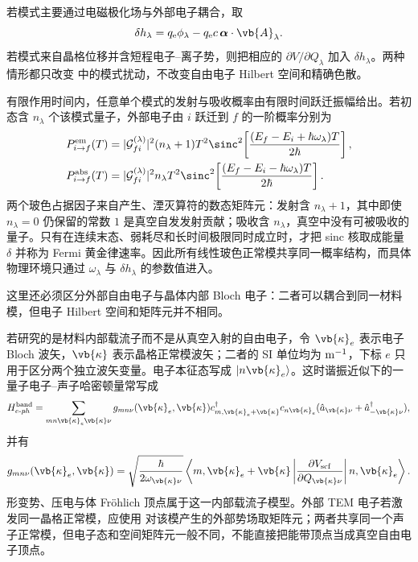 若模式主要通过电磁极化场与外部电子耦合，取
\begin{equation*}
\delta h_\lambda
=q_{\mathrm e}\phi_\lambda
-q_{\mathrm e} c\,\boldsymbol\alpha\cdot\vb{A}_\lambda.
\end{equation*}
若模式来自晶格位移并含短程电子--离子势，则把相应的 $\partial V/\partial Q_\lambda$ 加入 $\delta h_\lambda$。两种情形都只改变 中的模式扰动，不改变自由电子 Hilbert 空间和精确色散。

有限作用时间内，任意单个模式的发射与吸收概率由有限时间跃迁振幅给出。若初态含 $n_\lambda$ 个该模式量子，外部电子由 $i$ 跃迁到 $f$ 的一阶概率分别为
\begin{equation}
{
\begin{aligned}
P_{i\to f}^{\rm em}(T)
&=|\mathcal G_{fi}^{(\lambda)}|^2(n_\lambda+1)T^2
\sinc^2\!\left[\frac{(E_f-E_i+\hbar\omega_\lambda)T}{2\hbar}\right],\\
P_{i\to f}^{\rm abs}(T)
&=|\mathcal G_{fi}^{(\lambda)}|^2n_\lambda T^2
\sinc^2\!\left[\frac{(E_f-E_i-\hbar\omega_\lambda)T}{2\hbar}\right].
\end{aligned}}
\label{eq:mode-emission-absorption-finite-time-dp68}
\end{equation}
两个玻色占据因子来自产生、湮灭算符的数态矩阵元：发射含 $n_\lambda+1$，其中即使 $n_\lambda=0$ 仍保留的常数 $1$ 是真空自发发射贡献；吸收含 $n_\lambda$，真空中没有可被吸收的量子。只有在连续末态、弱耗尽和长时间极限同时成立时，才把 sinc 核取成能量 $\delta$ 并称为 Fermi 黄金律速率。因此所有线性玻色正常模共享同一概率结构，而具体物理环境只通过 $\omega_\lambda$ 与 $\delta h_\lambda$ 的参数值进入。

这里还必须区分外部自由电子与晶体内部 Bloch 电子：二者可以耦合到同一材料模，但电子 Hilbert 空间和矩阵元并不相同。

若研究的是材料内部载流子而不是从真空入射的自由电子，令 $\vb{\kappa}_e$ 表示电子 Bloch 波矢，$\vb{\kappa}$ 表示晶格正常模波矢；二者的 SI 单位均为 ${\rm m^{-1}}$，下标 $e$ 只用于区分两个独立波矢变量。电子本征态写成 $|n\vb{\kappa}_e\rangle$。这时谐振近似下的一量子电子--声子哈密顿量常写成
\begin{equation*}
H_{e\text{-}ph}^{\rm band}
=\sum_{mn\vb{\kappa}_e\vb{\kappa}\nu}
 g_{mn\nu}(\vb{\kappa}_e,\vb{\kappa})
 c_{m,\vb{\kappa}_e+\vb{\kappa}}^\dagger c_{n\vb{\kappa}_e}
 (\hat a_{\vb{\kappa}\nu}+\hat a_{-\vb{\kappa}\nu}^\dagger),
\end{equation*}
并有
\begin{equation*}
 g_{mn\nu}(\vb{\kappa}_e,\vb{\kappa})
=\sqrt{\frac{\hbar}{2\omega_{\vb{\kappa}\nu}}}
\left\langle m,\vb{\kappa}_e+\vb{\kappa}\left|
\frac{\partial V_{\rm scf}}{\partial Q_{\vb{\kappa}\nu}}
\right|n,\vb{\kappa}_e\right\rangle.
\end{equation*}
形变势、压电与体 Fr\"ohlich 顶点属于这一内部载流子模型。外部 TEM 电子若激发同一晶格正常模，应使用 对该模产生的外部势场取矩阵元；两者共享同一个声子正常模，但电子态和空间矩阵元一般不同，不能直接把能带顶点当成真空自由电子顶点。


